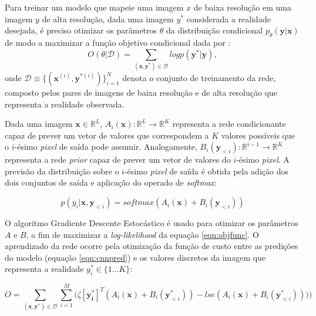 Para treinar um modelo que mapeie uma imagem $x$ de baixa resolução em uma imagem $y$ de alta resolução,
dada uma imagem $y^*$ considerada a realidade desejada, é preciso otimizar os parâmetros
$\theta$ da distribuição condicional $p_{\theta}(\boldsymbol{y}|\boldsymbol{x})$ de modo
a maximizar a função objetivo condicional dada por \citep{DahlNS17}:
\begin{equation}
\label{eqn:objfunc}
O(\theta|\mathcal{D})= \sum_{(\boldsymbol{x},\boldsymbol{y^*})\in \mathcal{D}} log p(\boldsymbol{y^*}|\boldsymbol{y}),
\end{equation}
onde $\mathcal{D} \equiv \{(\boldsymbol{x}^{(i)},\boldsymbol{y}^{*(i)})\}_{i=1}^N$ denota o conjunto
de treinamento da rede, composto pelos pares de imagens de baixa resolução e de alta resolução que representa
a realidade observada.

Dada uma imagem $ \boldsymbol{x} \in \mathbb{R}^L $, $A_i(\boldsymbol{x}) : \mathbb{R}^L \rightarrow \mathbb{R}^K$
representa a rede condicionante capaz de prever um vetor de valores que correspondem a $K$ valores
possíveis que o $i$-ésimo \textit{pixel} de saída pode assumir. Analogamente,
$B_i(\boldsymbol{y}_{<i}) : \mathbb{R}^{i-1} \rightarrow \mathbb{R}^K$ representa a rede \textit{prior}
capaz de prever um vetor de valores do $i$-ésimo \textit{pixel}. A previsão da distribuição
sobre o $i$-ésimo \textit{pixel} de saída é obtida pela adição dos dois conjuntos de saída e aplicação
do operado de \textit{softmax}:

\begin{equation}
\label{eqn:cnnpred}
p(y_i|\boldsymbol{x},\boldsymbol{y}_{<i}) = softmax(A_i(\boldsymbol{x}) + B_i(\boldsymbol{y}_{<i}))
\end{equation}

O algoritmo Gradiente Descente Estocástico é usado para otimizar os parâmetros $A$ e $B$, a fim de maximizar
a \textit{log-likelihood} da equação \ref{eqn:objfunc}. O aprendizado da rede ocorre pela otimização da função de custo entre
as predições do modelo (equação \ref{eqn:cnnpred}) e os valores discretos da imagem que representa
a realidade $y_i^* \in \{1...K\}$:

\begin{equation}
\label{eqn:cnncostfunc}
O = \sum_{(\boldsymbol{x},\boldsymbol{y^*})\in \mathcal{D}} \sum_{i=1}^{M}\big(\zeta [\boldsymbol{y_i^*}]^T(A_i(\boldsymbol{x}) + B_i(\boldsymbol{y}_{<i}^*))
-lse(A_i(\boldsymbol{x}) + B_i(\boldsymbol{y}_{<i}^*))) \big)
\end{equation}

